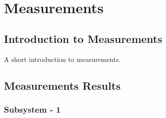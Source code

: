 \chapter{Measurements}
\label{chapter:measurements}
\section{Introduction to Measurements}
A short introduction to measurements.

\section{Measurements Results}
\subsection{Subsystem - 1}